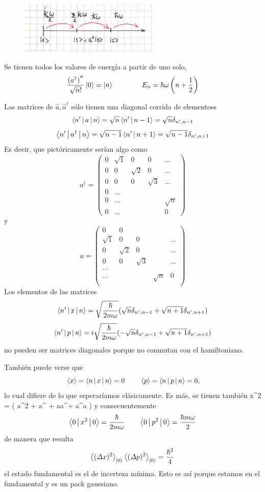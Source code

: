 \documentclass[10pt,oneside]{CBFT_book}
\begin{document}
\begin{figure}[htb]
	\begin{center}
	\includegraphics[width=0.6\textwidth]{images/fig_ft2_osc_arm1.jpg}	 
	\end{center}
	\caption{}
\end{figure} 

Se tienen todos los valores de energía a partir de uno solo,
\[
	\frac{{(a^{\dagger})}^n}{\sqrt{n}!} \Ket{0} = \Ket{n} \qquad \qquad 
	E_n = \hbar \omega \left( n + \frac{1}{2} \right)
\]

Las matrices de $\hat{a},\hat{a}^\dagger$ sólo tienen una diagonal corrida de elementoss 
\[
	\Braket{n'|a|n} = \sqrt{n} \Braket{n'|n-1} = \sqrt{n} \delta_{n',n-1}
\]
\[
	\Braket{n'|a^\dagger|n} =  \sqrt{n-1} \Braket{n'|n+1} = \sqrt{n-1} \delta_{n',n+1}
\]
Es decir, que pictóricamente serían algo como
\[
	a^\dagger = \begin{pmatrix}
	0 & \sqrt{1} & 0 & 0 & ... \\
	0 & 	0    & \sqrt{2} & 0 & ... \\
	0 & 	0    & 0 & \sqrt{3} & ... \\
	0 & ... \\
	0 & ... & & & \sqrt{n} \\
	0 & ... & & & 0 
	\end{pmatrix}
\]
y
\[
	a = \begin{pmatrix}
	0 & 0 & & & \\
	\sqrt{1} & 0 & 0 & & ... \\
		0    & \sqrt{2} & 0 & & ... \\
	 	0    & 0 & \sqrt{3} & &... \\
	 ... \\
	 ... & & & \sqrt{n} & 0 \\
	\end{pmatrix}
\]
Los elementos de las matrices
\[
	\Braket{n'|x|n} = \sqrt{\frac{\hbar}{2m\omega}}
	(\sqrt{n}\delta_{n',n-1} + \sqrt{n+1}\delta_{n',n+1})
\]
\[
	\Braket{n'|p|n} = i \sqrt{\frac{\hbar}{2m\omega}}
	(-\sqrt{n}\delta_{n',n-1} + \sqrt{n+1}\delta_{n',n+1})
\]
no pueden ser matrices diagonales porque no conmutan con el hamiltoniano.

También puede verse que 
\[
	\:\left\langle x \right\rangle = \Braket{n|x|n}= 0 \qquad \:\left\langle p \right\rangle = \Braket{n|p|n}= 0,
\]
lo cual difiere de lo que esperaríamos clásicamente. Es más, se tienen también
\be
	x^2 = ( a^2 + a^{} + aa^\dagger + a^\dagger a )
	\label{x2_osc_arm}
\ee
y consecuentemente
\[
	\Braket{0|x^2|0}= \frac{\hbar}{2 m \omega} \qquad 
	\Braket{0|p^2|0}= \frac{\hbar m \omega}{2}
\]
de manera que resulta
\[
	\Braket{(\Delta x)^2}_{\Ket{0}} \Braket{(\Delta p)^2}_{\Ket{0}} = \frac{\hbar^2}{4} 
\]
el estado fundamental es el de incerteza mínima.
Esto es así porque estamos en el fundamental y es un pack gaussiano.
\end{document}
